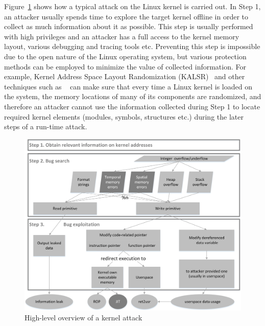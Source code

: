 Figure~\ref{fig:exploit-steps} shows how a typical attack on the Linux kernel is carried out. In Step 1, an attacker usually spends time to explore the target kernel offline in order to collect as much information about it as possible. This step is usually performed with high privileges and an attacker has a full access to the kernel memory layout, various debugging and tracing tools etc. Preventing this step is impossible due to the open nature of the Linux operating system, but various protection methods can be employed to minimize the value of collected information. For example, Kernel Address Space Layout Randomization (KALSR)~\cite{cook2013} and other techniques such as ~\cite{randstruct2017} can make sure that every time a Linux kernel is loaded on the system, the memory locations of many of its components are randomized, and therefore an attacker cannot use the information collected during Step 1 to locate required kernel elements (modules, symbols, structures etc.) during the later steps of a run-time attack. 

\begin{figure}[t]
	\centering
		\includegraphics[width=1\textwidth]{figures/kernel_exploit_steps.png}
	\caption{High-level overview of a kernel attack}
	\label{fig:exploit-steps}
\end{figure}    

